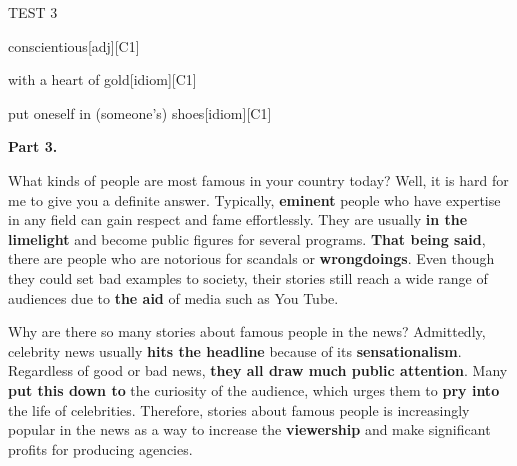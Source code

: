 \begin{glossarymc}[Cambridge 15]
\begin{test}{TEST 3}
\begin{VocabExplain}[Part 2]
            \begin{ExplainCard}{conscientious}[adj][C1]
            \end{ExplainCard}

            \begin{ExplainCard}{with a heart of gold}[idiom][C1]
            \end{ExplainCard}

            \begin{ExplainCard}{put oneself in (someone’s) shoes}[idiom][C1]
            \end{ExplainCard}
        \end{VocabExplain}

    \noindent
    \textbf{Part 3.}
    \begin{qa}{What kinds of people are most famous in your country today?}
    Well, it is hard for me to give you a definite answer. Typically, \textbf{eminent} people who have expertise in any field can gain respect and fame effortlessly. They are usually \textbf{in the limelight} and become public figures for several programs. \textbf{That being said}, there are people who are notorious for scandals or \textbf{wrongdoings}. Even though they could set bad examples to society, their stories still reach a wide range of audiences due to \textbf{the aid} of media such as You Tube.
    \end{qa}

    \begin{qa}{Why are there so many stories about famous people in the news?}
    Admittedly, celebrity news usually \textbf{hits the headline} because of its \textbf{sensationalism}. Regardless of good or bad news, \textbf{they all draw much public attention}. Many \textbf{put this down to} the curiosity of the audience, which urges them to \textbf{pry into} the life of celebrities. Therefore, stories about famous people is increasingly popular in the news as a way to increase the \textbf{viewership} and make significant profits for producing agencies.
    \end{qa}


\end{test}
\end{glossarymc}
